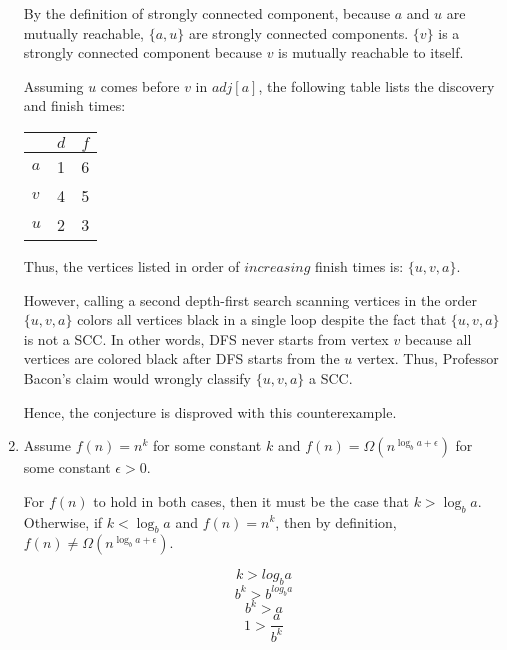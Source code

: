 \documentclass[a4paper]{report}
\begin{document}
\begin{enumerate}
      By the definition of strongly connected component, because $a$ and $u$ are mutually reachable,
      $\{a,u\}$ are strongly connected components. $\{v\}$ is a strongly connected component because $v$
      is mutually reachable to itself. 

      Assuming $u$ comes before $v$ in $adj[a]$, the following table lists the discovery and finish times:

      \begin{center}
        \begin{tabular}{ l | c | r }
          \hline
            & $d$ & $f$ \\ \hline
          $a$ & 1 & 6 \\
          $v$ & 4 & 5 \\
          $u$ & 2 & 3 \\
          \hline  
        \end{tabular}
      \end{center}

      Thus, the vertices listed in order of $increasing$ finish times is: $\{u, v, a\}$.

      However, calling a second depth-first search scanning vertices in the order $\{u, v, a\}$ colors
      all vertices black in a single loop despite the fact that $\{u, v, a\}$ is not a SCC. 
      In other words, DFS never starts from vertex $v$ because all vertices are colored black after DFS starts from the $u$ vertex. 
      Thus, Professor Bacon's claim would wrongly classify $\{u, v, a\}$ a SCC.

      Hence, the conjecture is disproved with this counterexample.

    \par
    \bigskip

    \item
        Assume $f(n) = n^k$ for some constant $k$ and $f(n) = \Omega(n^{\log_b a + \epsilon})$ for some constant $\epsilon > 0$.

        For $f(n)$ to hold in both cases, then it must be the case that $k > \log _{b} a$. Otherwise, if $k < \log _{b} a$ and
        $f(n) = n^k$, then by definition, $f(n) \neq \Omega(n^{\log_b a + \epsilon})$.

        $$ k > log_b a$$
        $$ b^k > b^{log_b a} $$
        $$ b^k > a $$
        $$ 1 > \frac{a}{b^k} $$


\end{enumerate}
\end{document}
